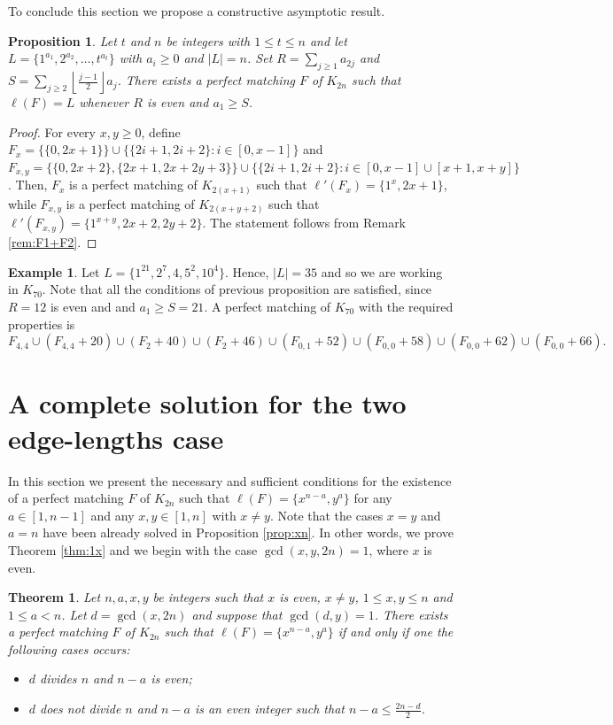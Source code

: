 \documentclass{amsart}
\newtheorem{prop}[defi]{Proposition}
\newtheorem{thm}[defi]{Theorem}
\theoremstyle{definition}
\newtheorem{ex}[defi]{Example}
\numberwithin{equation}{section}
\begin{document}
To conclude this section we propose a constructive asymptotic result.
\begin{prop}
Let $t$ and $n$ be integers with $1\leq t\leq n$ and
let $L=\{1^{a_1}, 2^{a_2}, \ldots, t^{a_t}\}$ with $a_i\geq 0$ and $|L|=n$.
Set $R=\sum\limits_{j\geq 1} a_{2 j}$ and
$S=\sum\limits_{j\geq 2} \left\lfloor\frac{j-1}{2}\right\rfloor a_j$.
There exists a perfect matching $F$ of $K_{2n}$ such that $\ell(F)=L$ whenever $R$ is even and $a_1\geq S$.
\end{prop}
\begin{proof}
For every $x,y\geq 0$, define
$F_x=\{ \{0,2x+1\}\} \cup \{ \{ 2i+1,2i+2 \}: i \in [0,x-1] \}$
and
$F_{x,y}=\{ \{0,2x+2\}, \{2x+1, 2x+2y+3\}\} \cup \{ \{2i+1, 2i+2\} : i \in [0,x-1]\cup [x+1,x+y] \}$.
Then, $F_x$ is a perfect matching of $K_{2(x+1)}$ such that $\ell'(F_x)=\{1^x, 2x+1\}$,
while $F_{x,y}$ is a perfect matching of $K_{2(x+y+2)}$ such that $\ell'(F_{x,y})=\{1^{x+y},2x+2,2y+2\}$.
The statement follows from Remark \ref{rem:F1+F2}.
\end{proof}

\begin{ex}
Let $L=\{1^{21},2^7,4,5^2,10^4\}$. Hence, $|L|=35$ and so we are working in $K_{70}$.
Note that all the conditions of previous proposition are satisfied, since $R=12$ is even and
and $a_1\geq S= 21$.
A perfect matching of $K_{70}$ with the required properties is
$$F_{4,4} \cup (F_{4,4}+20) \cup (F_2+40)\cup (F_2+46)\cup (F_{0,1}+52) \cup (F_{0,0}+58)\cup (F_{0,0}+62)
\cup (F_{0,0}+66).$$
\end{ex}




\section{A complete solution for the two edge-lengths case}\label{sec:1x}

In this section we present the necessary and sufficient conditions for the existence
of a perfect matching $F$ of $K_{2n}$ such that $\ell(F)=\{x^{n-a}, y^a\}$ for any $a\in [1,n-1]$
and any $x,y \in [1, n]$ with $x\neq y$.
Note that the cases $x=y$ and $a=n$ have been already  solved in Proposition \ref{prop:xn}.
In other words, we prove Theorem \ref{thm:1x} and we begin with the case $\gcd(x,y,2n)=1$, where $x$ is even.

\begin{thm}\label{thm:xy}
Let $n,a,x,y$ be integers such that $x$ is even, $x \neq y$, $1 \leq x,y\leq  n$   and $1\leq a <n$.
Let $d=\gcd(x,2n)$ and suppose that $\gcd(d,y)=1$.
There exists a perfect matching $F$ of $K_{2n}$ such that $\ell(F)=\{ x^{n-a}, y^{a} \}$
if and only if one the following cases occurs:
\begin{itemize}
 \item[(1)] $d$ divides $n$ and $n-a$ is even;
 \item[(2)] $d$ does not divide $n$ and $n-a$ is an even integer such that $n-a\leq \frac{2n-d}{2}$.
\end{itemize}
\end{thm}
\end{document}
